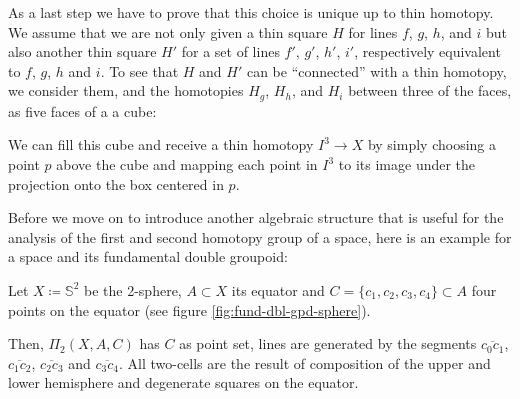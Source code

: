 \begin{defn}
As a last step we have to prove that this choice is unique up to thin homotopy.
We assume that we are not only given a thin square $H$ for
lines $f$, $g$, $h$, and $i$ but also another thin square $H'$ for a set of lines
$f'$, $g'$, $h'$, $i'$, respectively equivalent to $f$, $g$, $h$ and $i$.
To see that $H$ and $H'$ can be ``connected'' with a thin homotopy,
we consider them, and the homotopies $H_g$, $H_h$, and $H_i$ between three of the faces,
as five faces of a a cube:

\begin{center}
\end{center}

We can fill this cube and receive a thin homotopy $I^3 \to X$ by simply choosing
a point $p$ above the cube and mapping each point in $I^3$ to its image under the
projection onto the box centered in $p$.
\end{defn}

Before we move on to introduce another algebraic structure that is useful for
the analysis of the first and second homotopy group of a space, here is an example
for a space and its fundamental double groupoid:

\begin{example} \label{example:fdblgpd-sphere}
Let $X \coloneqq \mathbb{S}^2$ be the 2-sphere, $A \subset X$ its equator and
$C = \{c_1, c_2, c_3, c_4\} \subset A$ four points on the equator (see
figure \ref{fig:fund-dbl-gpd-sphere}).

Then, $\Pi_2(X, A, C)$ has $C$ as point set, lines are generated by the segments
$\overline{c_0 c_1}$, $\overline{c_1 c_2}$, $\overline{c_2 c_3}$ and
$\overline{c_3 c_4}$.
All two-cells are the result of composition of the upper and lower hemisphere
and degenerate squares on the equator.
\end{example}

